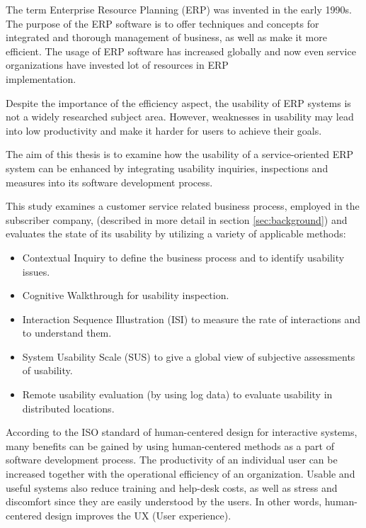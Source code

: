 \documentclass[12pt,a4paper,oneside,pdftex]{report}
\begin{document}
The term Enterprise Resource Planning (ERP) was invented in the early 1990s.\cite{RefWorks:3} The purpose of the ERP software is to offer techniques and concepts for integrated and thorough management of business, as well as make it more efficient.
The usage of ERP software has increased globally and now even service organizations have invested lot of resources in ERP \\  implementation.\cite{RefWorks:1, RefWorks:7} 

Despite the importance of the efficiency aspect, the usability of ERP systems is not a widely researched subject area. However, weaknesses in usability may lead into low productivity and make it harder for users to achieve their goals.\cite{RefWorks:2} 

The aim of this thesis is to examine how the usability of a service-oriented ERP system can be enhanced by integrating usability inquiries, inspections and measures into its software development process. 


This study examines a customer service related business process, employed in the subscriber company, (described in more detail in section \ref{sec:background}) and evaluates the state of its usability by utilizing a variety of applicable methods:
\begin{itemize}
\item Contextual Inquiry to define the business process and to identify usability issues.
\item Cognitive Walkthrough for usability inspection.
\item Interaction Sequence Illustration (ISI) to measure the rate of interactions and to understand them.
\item System Usability Scale (SUS) to give a global view of subjective assessments of usability.
\item Remote usability evaluation (by using log data) to evaluate usability in distributed locations.
\end{itemize}

\indent According to the ISO standard of human-centered design for interactive systems, many benefits can be gained by using human-centered methods as a part of software development process. The productivity of an individual user can be increased together with the operational efficiency of an organization. Usable and useful systems also reduce training and help-desk costs, as well as stress and discomfort since they are easily understood by the users. In other words, human-centered design improves the UX (User experience). \cite{RefWorks:16}
\end{document}
